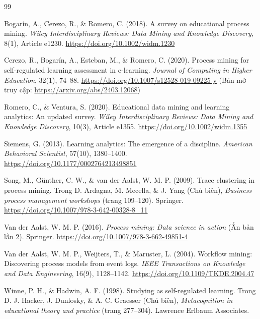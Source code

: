 \begin{thebibliography}{99}

Bogarín, A., Cerezo, R., \& Romero, C. (2018). A survey on educational process mining. \textit{Wiley Interdisciplinary Reviews: Data Mining and Knowledge Discovery}, 8(1), Article e1230. \url{https://doi.org/10.1002/widm.1230}

Cerezo, R., Bogarín, A., Esteban, M., \& Romero, C. (2020). Process mining for self-regulated learning assessment in e-learning. \textit{Journal of Computing in Higher Education}, 32(1), 74–88. \url{https://doi.org/10.1007/s12528-019-09225-y} (Bản mở truy cập: \url{https://arxiv.org/abs/2403.12068})

Romero, C., \& Ventura, S. (2020). Educational data mining and learning analytics: An updated survey. \textit{Wiley Interdisciplinary Reviews: Data Mining and Knowledge Discovery}, 10(3), Article e1355. \url{https://doi.org/10.1002/widm.1355}

Siemens, G. (2013). Learning analytics: The emergence of a discipline. \textit{American Behavioral Scientist}, 57(10), 1380–1400. \url{https://doi.org/10.1177/0002764213498851}

Song, M., Günther, C. W., \& van der Aalst, W. M. P. (2009). Trace clustering in process mining. Trong D. Ardagna, M. Mecella, \& J. Yang (Chủ biên), \textit{Business process management workshops} (trang 109–120). Springer. \url{https://doi.org/10.1007/978-3-642-00328-8_11}

Van der Aalst, W. M. P. (2016). \textit{Process mining: Data science in action} (Ấn bản lần 2). Springer. \url{https://doi.org/10.1007/978-3-662-49851-4}

Van der Aalst, W. M. P., Weijters, T., \& Maruster, L. (2004). Workflow mining: Discovering process models from event logs. \textit{IEEE Transactions on Knowledge and Data Engineering}, 16(9), 1128–1142. \url{https://doi.org/10.1109/TKDE.2004.47}

Winne, P. H., \& Hadwin, A. F. (1998). Studying as self-regulated learning. Trong D. J. Hacker, J. Dunlosky, \& A. C. Graesser (Chủ biên), \textit{Metacognition in educational theory and practice} (trang 277–304). Lawrence Erlbaum Associates.

\end{thebibliography}
